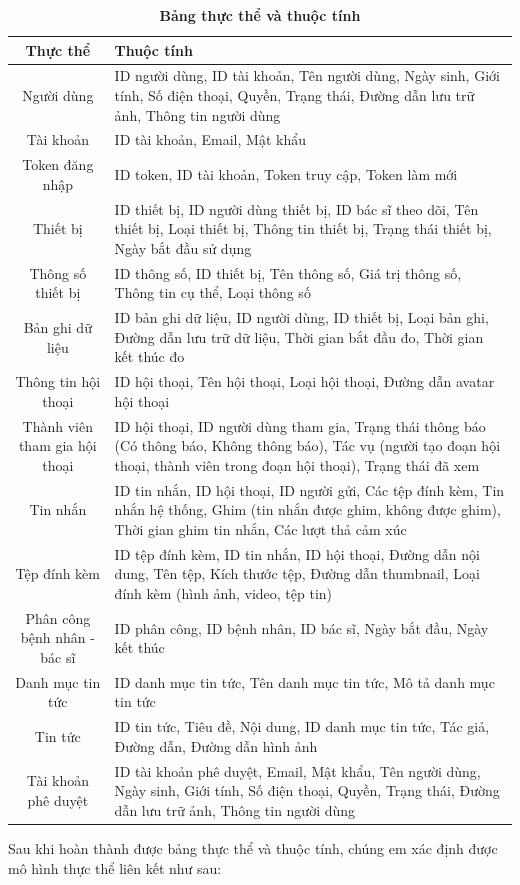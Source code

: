 \begin{table}[H]
  \caption{\bfseries \fontsize{12pt}{0pt}\selectfont Bảng thực thể và thuộc tính}
  \centering
  \begin{tabularx}{0.9\textwidth}{|c|X|}
    \hline
    \textbf{Thực thể} & \textbf{Thuộc tính} \\
    \hline
    Người dùng & 
    ID người dùng, ID tài khoản, Tên người dùng, Ngày sinh, Giới tính, Số điện thoại, Quyền, Trạng thái, Đường dẫn lưu trữ ảnh, Thông tin người dùng \\
    \hline
    Tài khoản &
    ID tài khoản, Email, Mật khẩu  \\
    \hline
    Token đăng nhập &
    ID token, ID tài khoản, Token truy cập, Token làm mới \\
    \hline
    Thiết bị & 
    ID thiết bị, ID người dùng thiết bị, ID bác sĩ theo dõi, Tên thiết bị, Loại thiết bị, Thông tin thiết bị, Trạng thái thiết bị, Ngày bắt đầu sử dụng\\
    \hline
    Thông số thiết bị &
    ID thông số, ID thiết bị, Tên thông số, Giá trị thông số, Thông tin cụ thể, Loại thông số \\
    \hline
    Bản ghi dữ liệu & 
    ID bản ghi dữ liệu, ID người dùng, ID thiết bị, Loại bản ghi, Đường dẫn lưu trữ dữ liệu, Thời gian bắt đầu đo, Thời gian kết thúc đo \\
    \hline
    Thông tin hội thoại &
    ID hội thoại, Tên hội thoại, Loại hội thoại, Đường dẫn avatar hội thoại \\
    \hline
    Thành viên tham gia hội thoại &
    ID hội thoại, ID người dùng tham gia, Trạng thái thông báo (Có thông báo, Không thông báo), Tác vụ (người tạo đoạn hội thoại, thành viên trong đoạn hội thoại), Trạng thái đã xem\\
    \hline
    Tin nhắn & 
    ID tin nhắn, ID hội thoại, ID người gửi, Các tệp đính kèm, Tin nhắn hệ thống, Ghim (tin nhắn được ghim, không được ghim), Thời gian ghim tin nhắn, Các lượt thả cảm xúc \\
    \hline
    Tệp đính kèm &
    ID tệp đính kèm, ID tin nhắn, ID hội thoại, Đường dẫn nội dung, Tên tệp, Kích thước tệp, Đường dẫn thumbnail, Loại đính kèm (hình ảnh, video, tệp tin) \\
    \hline 
    Phân công bệnh nhân - bác sĩ & 
    ID phân công, ID bệnh nhân, ID bác sĩ, Ngày bắt đầu, Ngày kết thúc \\
    \hline
    Danh mục tin tức &
    ID danh mục tin tức, Tên danh mục tin tức, Mô tả danh mục tin tức \\
    \hline
    Tin tức &
    ID tin tức, Tiêu đề, Nội dung, ID danh mục tin tức, Tác giả, Đường dẫn, Đường dẫn hình ảnh \\
    \hline
    Tài khoản phê duyệt & 
    ID tài khoản phê duyệt, Email, Mật khẩu, Tên người dùng, Ngày sinh, Giới tính, Số điện thoại, Quyền, Trạng thái, Đường dẫn lưu trữ ảnh, Thông tin người dùng \\
    \hline
  \end{tabularx}

  
\end{table}
Sau khi hoàn thành được bảng thực thể và thuộc tính, chúng em xác định được mô hình thực thể liên kết như sau:

